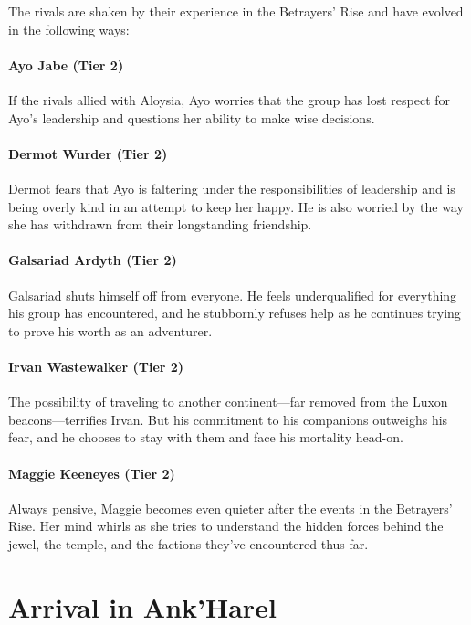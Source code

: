 \documentclass[letterpaper, 11pt, bg=full, twocolumn]{dndbook}
\begin{document}
The rivals are shaken by their experience in the Betrayers' Rise and have evolved in the following ways:

\paragraph{Ayo Jabe (Tier 2)}

If the rivals allied with Aloysia, Ayo worries that the group has lost respect for Ayo's leadership and questions her ability to make wise decisions.

\paragraph{Dermot Wurder (Tier 2)}

Dermot fears that Ayo is faltering under the responsibilities of leadership and is being overly kind in an attempt to keep her happy. He is also worried by the way she has withdrawn from their longstanding friendship.

\paragraph{Galsariad Ardyth (Tier 2)}

Galsariad shuts himself off from everyone. He feels underqualified for everything his group has encountered, and he stubbornly refuses help as he continues trying to prove his worth as an adventurer.

\paragraph{Irvan Wastewalker (Tier 2)}

The possibility of traveling to another continent---far removed from the Luxon beacons---terrifies Irvan. But his commitment to his companions outweighs his fear, and he chooses to stay with them and face his mortality head-on.

\paragraph{Maggie Keeneyes (Tier 2)}

Always pensive, Maggie becomes even quieter after the events in the Betrayers' Rise. Her mind whirls as she tries to understand the hidden forces behind the jewel, the temple, and the factions they've encountered thus far.
\section{Arrival in Ank'Harel}
\end{document}
